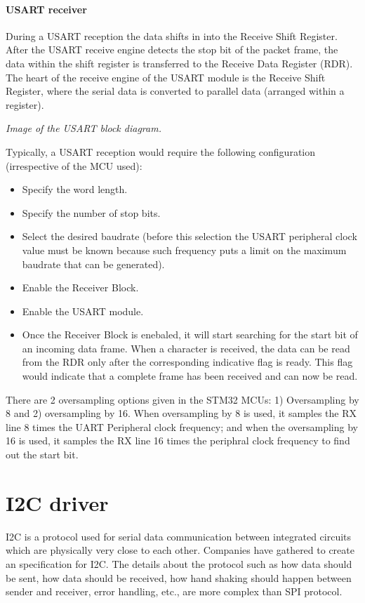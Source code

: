 \documentclass[
a4paper, %
11pt, %
onecolumn, %
openany, %
]{memoir}
\begin{document}
\subsubsection{USART receiver}
During a USART reception the data shifts in into the Receive Shift Register. After the USART receive engine detects the stop bit of the packet frame, the data within the shift register is transferred to the Receive Data Register (RDR). The heart of the receive engine of the USART module is the Receive Shift Register, where the serial data is converted to parallel data (arranged within a register).

\begin{center}
\textit{Image of the USART block diagram.}
\end{center}

\noindent Typically, a USART reception would require the following configuration (irrespective of the MCU used):

\begin{itemize}
	\item	Specify the word length.
	\item	Specify the number of stop bits.
	\item	Select the desired baudrate (before this selection the USART peripheral clock value must be known because such frequency puts a limit on the maximum baudrate that can be generated).
	\item	Enable the Receiver Block.
	\item	Enable the USART module.
	\item	Once the Receiver Block is enebaled, it will start searching for the start bit of an incoming data frame. When a character is received, the data can be read from the RDR only after the corresponding indicative flag is ready. This flag would indicate that a complete frame has been received and can now be read.
\end{itemize}

\noindent There are 2 oversampling options given in the STM32 MCUs: 1) Oversampling by 8 and 2) oversampling by 16. When oversampling by 8 is used, it samples the RX line 8 times the UART Peripheral clock frequency; and when the oversampling by 16 is used, it samples the RX line 16 times the periphral clock frequency to find out the start bit.


\chapter{I2C driver}
I2C is a protocol used for serial data communication between integrated circuits which are physically very close to each other. Companies have gathered to create an specification for I2C. The details about the protocol such as how data should be sent, how data should be received, how hand shaking should happen between sender and receiver, error handling, etc., are more complex than SPI protocol.
\end{document}
